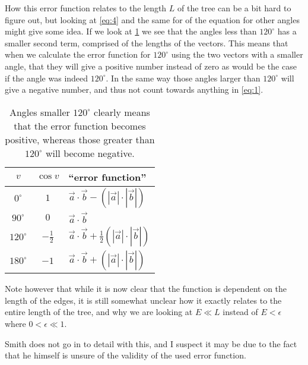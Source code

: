 How this error function relates to the length $L$ of the tree can be a bit hard
to figure out, but looking at \cref{eq:4} and the same for of the equation for
other angles might give some idea.  If we look at \cref{tab:error-functions} we
see that the angles less than $120^{\circ}$ has a smaller second term, comprised
of the lengths of the vectors.  This means that when we calculate the error
function for $120^{\circ}$ using the two vectors with a smaller angle, that they
will give a positive number instead of zero as would be the case if the angle
was indeed $120^{\circ}$.  In the same way those angles larger than
$120^{\circ}$ will give a negative number, and thus not count towards anything
in \cref{eq:1}.

\begin{table}[htbp] \centering
  \begin{tabular}{ccl}
    \toprule
    $v$           & $\cos v$       & ``error function''                    \\
    \midrule
    $0^{\circ}$   & $1$            & $\vec a \cdot \vec b -
                                     (|\vec a| \cdot |\vec b|)$            \\
    $90^{\circ}$  & $0$            & $\vec a \cdot \vec b$                 \\
    $120^{\circ}$ & $-\frac{1}{2}$ & $\vec a \cdot \vec b +
                                     \frac{1}{2}(|\vec a| \cdot |\vec b|)$ \\
    $180^{\circ}$ & $-1$           & $\vec a \cdot \vec b +
                                     (|\vec a| \cdot |\vec b|)$            \\
    \bottomrule
  \end{tabular}
  \caption[Angles and their corresponding ``error functions'']{Angles smaller
    $\mathit{120^{\circ}}$ clearly means that the error function becomes positive,
    whereas those greater than $\mathit{120^{\circ}}$ will become
    negative.\label{tab:error-functions}}
\end{table}

Note however that while it is now clear that the function is dependent on the
length of the edges, it is still somewhat unclear how it exactly relates to the
entire length of the tree, and why we are looking at $E \ll L$ instead of $E <
\epsilon$ where $0 < \epsilon \ll 1$.

Smith does not go in to detail with this, and I suspect it may be due to the
fact that he himself is unsure of the validity of the used error function.

\chapterbreak{}

